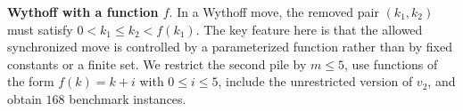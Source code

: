 \documentclass[review]{elsarticle}
\newcommand{\set}[1]{\{ #1 \}}
\newcommand{\tuple}[1]{\langle {#1} \rangle}
\newcommand{\true}{\top}
\newcommand{\statevar}{\mathcal{X}}
\newcommand{\act}{\mathcal{A}}
\newcommand{\constraint}{\mathcal{C}}
\newcommand{\estate}{\mathcal{E}}
\newcommand{\pre}{\mathtt{pre}}
\newcommand{\eff}{\mathtt{eff}}
\begin{document}
{\color{red}\textbf{Wythoff with a function $f$}. In a Wythoff move, the removed pair $(k_1,k_2)$ must satisfy $0 < k_1 \le k_2 < f(k_1)$.}
{\color{red}The key feature here is that the allowed synchronized move is controlled by a parameterized function rather than by fixed constants or a finite set.}
{\color{red}We restrict the second pile by $m \le 5$, use functions of the form $f(k)=k+i$ with $0 \le i \le 5$, include the unrestricted version of $v_2$, and obtain $168$ benchmark instances.}
\end{document}
